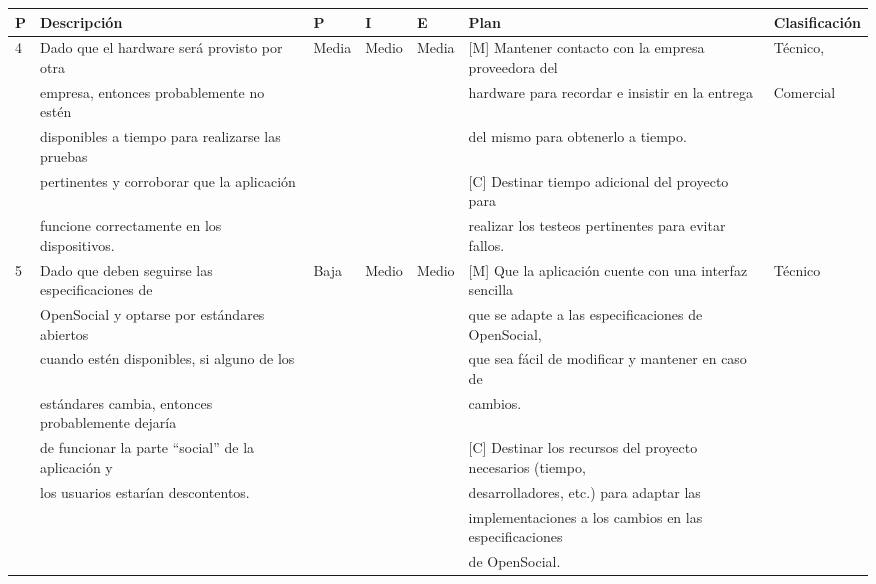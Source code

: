 \begin{landscape}
\begin{table}
\centering
\begin{tabular}{| l | l | l | l | l | l | l | }
     \hline
P & Descripción & P & I & E & Plan & Clasificación \\ \hline

4 & Dado que el hardware será provisto por otra  & Media & Medio & Media & [M] Mantener contacto con la empresa proveedora del  & Técnico, \\
  & empresa, entonces probablemente no estén  & & & &				hardware para recordar e insistir en la entrega & Comercial\\
  & disponibles a tiempo para realizarse las pruebas  & & & &		del mismo para obtenerlo a tiempo. & \\
  & pertinentes y corroborar que la aplicación		  & & & & 		[C] Destinar tiempo adicional del proyecto para  & \\ 
  & funcione correctamente en los dispositivos. &&&					&realizar los testeos pertinentes para evitar fallos. & \\ \hline

5 & Dado que deben seguirse las especificaciones de & Baja & Medio & Medio & [M] Que la aplicación cuente con una interfaz sencilla  & Técnico\\
  & OpenSocial y optarse por estándares abiertos  & & & &		que se adapte a las especificaciones de OpenSocial,	& \\
  & cuando estén disponibles, si alguno de los  & & & &			que sea fácil de modificar  y mantener en caso de  & \\
  & estándares cambia, entonces probablemente dejaría  & & & &	cambios.		 & \\ 
  & de funcionar la parte “social” de la aplicación y &&&		&[C] Destinar los recursos del proyecto necesarios (tiempo,  & \\ 
  & los usuarios estarían descontentos. &&&					&  	desarrolladores, etc.) para adaptar las& \\ 
  &&&&														&	implementaciones a los cambios en las especificaciones &\\
  &&&&														&	de OpenSocial. &\\	   \hline
  

\end{tabular}
\end{table}
\end{landscape}
